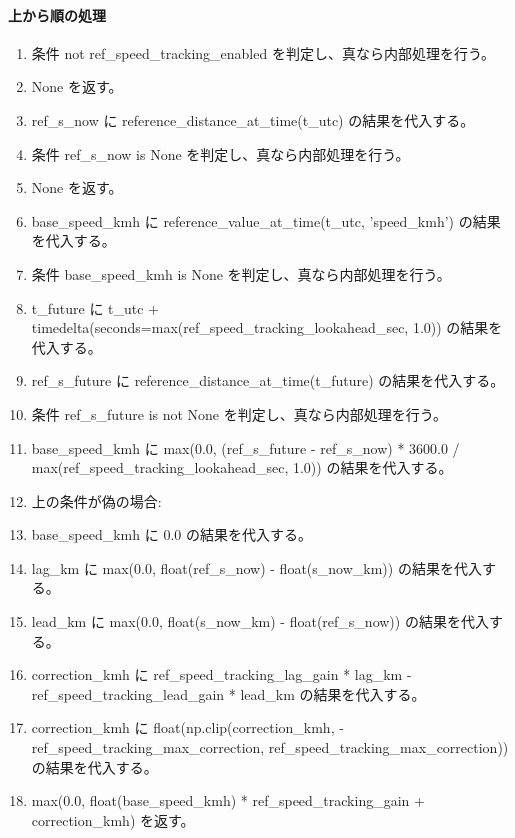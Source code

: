 \documentclass[a4paper,11pt]{article}
\begin{document}
            \paragraph{上から順の処理}
            \begin{enumerate}[leftmargin=1.8em]
            \item 条件 not ref\_speed\_tracking\_enabled を判定し、真なら内部処理を行う。
\item   None を返す。
\item ref\_s\_now に reference\_distance\_at\_time(t\_utc) の結果を代入する。
\item 条件 ref\_s\_now is None を判定し、真なら内部処理を行う。
\item   None を返す。
\item base\_speed\_kmh に reference\_value\_at\_time(t\_utc, 'speed\_kmh') の結果を代入する。
\item 条件 base\_speed\_kmh is None を判定し、真なら内部処理を行う。
\item   t\_future に t\_utc + timedelta(seconds=max(ref\_speed\_tracking\_lookahead\_sec, 1.0)) の結果を代入する。
\item   ref\_s\_future に reference\_distance\_at\_time(t\_future) の結果を代入する。
\item   条件 ref\_s\_future is not None を判定し、真なら内部処理を行う。
\item     base\_speed\_kmh に max(0.0, (ref\_s\_future - ref\_s\_now) * 3600.0 / max(ref\_speed\_tracking\_lookahead\_sec, 1.0)) の結果を代入する。
\item     上の条件が偽の場合:
\item     base\_speed\_kmh に 0.0 の結果を代入する。
\item lag\_km に max(0.0, float(ref\_s\_now) - float(s\_now\_km)) の結果を代入する。
\item lead\_km に max(0.0, float(s\_now\_km) - float(ref\_s\_now)) の結果を代入する。
\item correction\_kmh に ref\_speed\_tracking\_lag\_gain * lag\_km - ref\_speed\_tracking\_lead\_gain * lead\_km の結果を代入する。
\item correction\_kmh に float(np.clip(correction\_kmh, -ref\_speed\_tracking\_max\_correction, ref\_speed\_tracking\_max\_correction)) の結果を代入する。
\item max(0.0, float(base\_speed\_kmh) * ref\_speed\_tracking\_gain + correction\_kmh) を返す。
            \end{enumerate}
\end{document}

